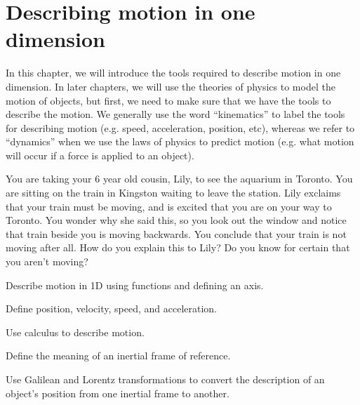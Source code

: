 %
\chapter{Describing motion in one dimension}
\label{Kinematics1D}
In this chapter, we will introduce the tools required to describe motion in one dimension. In later chapters, we will use the theories of physics to model the motion of objects, but first, we need to make sure that we have the tools to describe the motion. We generally use the word ``kinematics'' to label the tools for describing motion (e.g. speed, acceleration, position, etc), whereas we refer to ``dynamics'' when we use the laws of physics to predict motion (e.g. what motion will occur if a force is applied to an object). 
 \vspace{1cm}
\begin{openingSA}
You are taking your 6 year old cousin, Lily, to see the aquarium in Toronto. You are sitting on the train in Kingston waiting to leave the station. Lily exclaims that your train must be moving, and is excited that you are on your way to Toronto. You wonder why she said this, so you look out the window and notice that train beside you is moving backwards. You conclude that your train is not moving after all. How do you explain this to Lily? Do you know for certain that you aren't moving?
\end{openingSA}
\vspace{12pt}
\begin{learningObjectives}
\item Describe motion in 1D using functions and defining an axis.
\item Define position, velocity, speed, and acceleration.
\item Use calculus to describe motion.
\item Define the meaning of an inertial frame of reference.
\item Use Galilean and Lorentz transformations to convert the description of an object's position from one inertial frame to another.
\end{learningObjectives}


